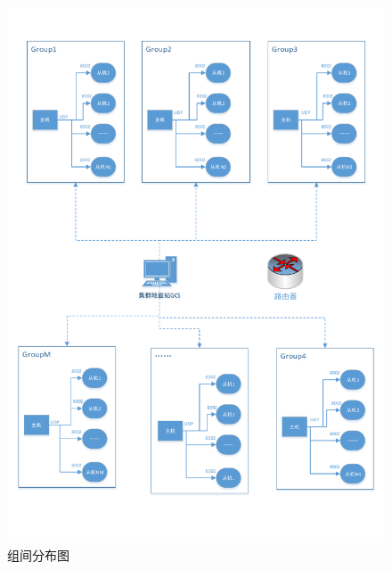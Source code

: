         \begin{figure}
          \centering
          \includegraphics[width=\textwidth]{pictures/groups.pdf}
          \caption{组间分布图}
          \label{fig:groups}
        \end{figure}
